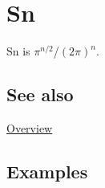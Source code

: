 \documentclass[../FeynCalcManual.tex]{subfiles}
\begin{document}
\hypertarget{sn}{
\section{Sn}\label{sn}}

Sn is \(\pi ^{n/2}\)/\((2\pi )^n\).

\subsection{See also}

\hyperlink{toc}{Overview}

\subsection{Examples}
\end{document}
